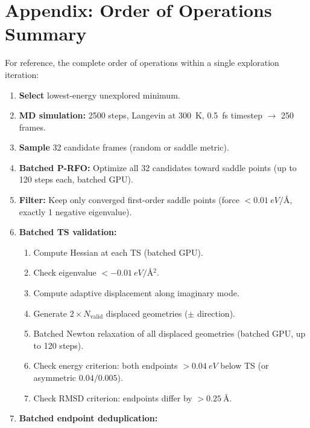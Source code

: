 \documentclass[11pt,a4paper]{article}
\begin{document}
\section{Appendix: Order of Operations Summary}

For reference, the complete order of operations within a single exploration iteration:

\begin{enumerate}[leftmargin=2cm]
    \item[\textbf{1.}] \textbf{Select} lowest-energy unexplored minimum.
    \item[\textbf{2.}] \textbf{MD simulation:} 2500 steps, Langevin at \SI{300}{K}, \SI{0.5}{fs} timestep $\to$ 250 frames.
    \item[\textbf{3.}] \textbf{Sample} 32 candidate frames (random or saddle metric).
    \item[\textbf{4.}] \textbf{Batched P-RFO:} Optimize all 32 candidates toward saddle points (up to 120 steps each, batched GPU).
    \item[\textbf{5.}] \textbf{Filter:} Keep only converged first-order saddle points (force $< \SI{0.01}{eV/\angstrom}$, exactly 1 negative eigenvalue).
    \item[\textbf{6.}] \textbf{Batched TS validation:}
    \begin{enumerate}[label=\alph*.]
        \item Compute Hessian at each TS (batched GPU).
        \item Check eigenvalue $< -\SI{0.01}{eV/\angstrom^2}$.
        \item Compute adaptive displacement along imaginary mode.
        \item Generate $2 \times N_\text{valid}$ displaced geometries ($\pm$ direction).
        \item Batched Newton relaxation of all displaced geometries (batched GPU, up to 120 steps).
        \item Check energy criterion: both endpoints $> \SI{0.04}{eV}$ below TS (or asymmetric $0.04/0.005$).
        \item Check RMSD criterion: endpoints differ by $> \SI{0.25}{\angstrom}$.
    \end{enumerate}
    \item[\textbf{7.}] \textbf{Batched endpoint deduplication:}
    \begin{enumerate}[label=\alph*.]

\end{enumerate}
\end{enumerate}
\end{document}
